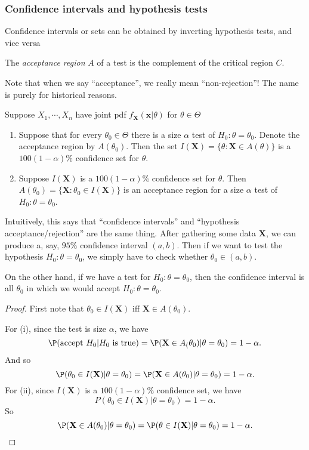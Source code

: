 \documentclass[a4paper]{article}
\begin{document}
\subsubsection{Confidence intervals and hypothesis tests}
Confidence intervals or sets can be obtained by inverting hypothesis tests, and vice versa

\begin{defi}
  The \emph{acceptance region} $A$ of a test is the complement of the critical region $C$.

  Note that when we say ``acceptance'', we really mean ``non-rejection''! The name is purely for historical reasons.
\end{defi}
Suppose $X_1, \cdots, X_n$ have joint pdf $f_\mathbf{X}(\mathbf{x}|\theta)$ for $\theta\in \Theta$

\begin{thm}[]\leavevmode
  \begin{enumerate}
    \item Suppose that for every $\theta_0\in \Theta$ there is a size $\alpha$ test of $H_0: \theta = \theta_0$. Denote the acceptance region by $A(\theta_0)$. Then the set $I(\mathbf{X}) = \{\theta:\mathbf{X}\in A(\theta)\}$ is a $100(1 - \alpha)\%$ confidence set for $\theta$.
    \item Suppose $I(\mathbf{X})$ is a $100(1 - \alpha)\%$ confidence set for $\theta$. Then $A(\theta_0) = \{\mathbf{X}: \theta_0 \in I(\mathbf{X})\}$ is an acceptance region for a size $\alpha$ test of $H_0: \theta = \theta_0$.
  \end{enumerate}
\end{thm}
Intuitively, this says that ``confidence intervals'' and ``hypothesis acceptance/rejection'' are the same thing. After gathering some data $\mathbf{X}$, we can produce a, say, $95\%$ confidence interval $(a, b)$. Then if we want to test the hypothesis $H_0: \theta = \theta_0$, we simply have to check whether $\theta_0 \in (a, b)$.

On the other hand, if we have a test for $H_0: \theta = \theta_0$, then the confidence interval is all $\theta_0$ in which we would accept $H_0: \theta = \theta_0$.
\begin{proof}
  First note that $\theta_0\in I(\mathbf{X})$ iff $\mathbf{X}\in A(\theta_0)$.

  For (i), since the test is size $\alpha$, we have
  \[
    \P(\text{accept }H_0|H_0\text{ is true}) = \P(\mathbf{X}\in A_(\theta_0)|\theta=\theta_0) = 1 - \alpha.
  \]
  And so
  \[
    \P(\theta_0\in I(\mathbf{X})|\theta = \theta_0) = \P(\mathbf{X}\in A(\theta_0)|\theta = \theta_0) = 1 - \alpha.
  \]
  For (ii), since $I(\mathbf{X})$ is a $100(1 - \alpha)\%$ confidence set, we have
  \[
    P(\theta_0\in I(\mathbf{X})| \theta = \theta_0) = 1- \alpha.
  \]
  So
  \[
    \P(\mathbf{X}\in A(\theta_0)|\theta = \theta_0) = \P(\theta\in I(\mathbf{X})|\theta = \theta_0) = 1- \alpha.
  \]
\end{proof}
\end{document}
